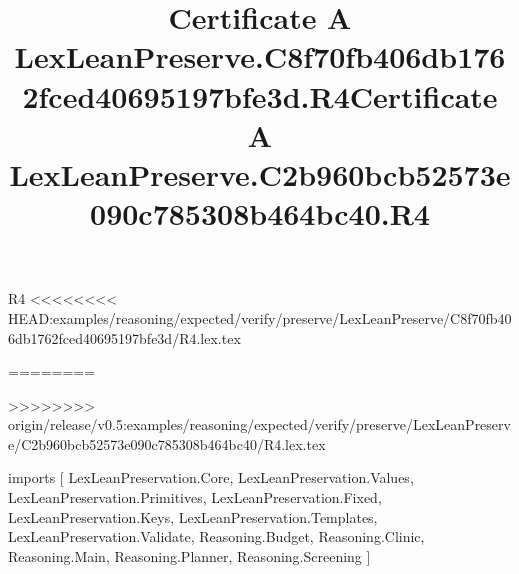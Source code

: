 \begin{lexlean}{R4}
<<<<<<<< HEAD:examples/reasoning/expected/verify/preserve/LexLeanPreserve/C8f70fb406db1762fced40695197bfe3d/R4.lex.tex
\title{Certificate A LexLeanPreserve.C8f70fb406db1762fced40695197bfe3d.R4}
========
\title{Certificate A LexLeanPreserve.C2b960bcb52573e090c785308b464bc40.R4}
>>>>>>>> origin/release/v0.5:examples/reasoning/expected/verify/preserve/LexLeanPreserve/C2b960bcb52573e090c785308b464bc40/R4.lex.tex
\begin{coremodule}
imports [
  LexLeanPreservation.Core,
  LexLeanPreservation.Values,
  LexLeanPreservation.Primitives,
  LexLeanPreservation.Fixed,
  LexLeanPreservation.Keys,
  LexLeanPreservation.Templates,
  LexLeanPreservation.Validate,
  Reasoning.Budget,
  Reasoning.Clinic,
  Reasoning.Main,
  Reasoning.Planner,
  Reasoning.Screening
]


\end{coremodule}
\end{lexlean}
